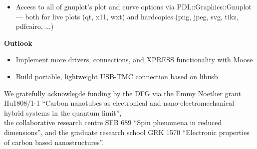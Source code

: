 \documentclass[portrait]{a0poster}
\newcommand{\lightblue}{\color{lightblue}}
\newcommand{\heading}[1]{
  {\color{heading}\boldmath\textbf{\huge #1}}\\[\medskipamount]
}
\begin{document}
{\begin{minipage}[t][\columnheighta-2\fboxsep-2\fboxrule][t]
\begin{minipage}{\textwidth}
\begin{itemize}
\item 
Access to all of gnuplot's {\lightblue plot and curve options} via 
PDL::Graphics::Gnuplot --- both for live plots (qt, x11, wxt) and hardcopies 
(png, jpeg, svg, tikz, pdfcairo, ...)
\end{itemize}

\vspace*{2cm}
\heading{Outlook}
\vspace*{-2cm}

\begin{itemize}
\item Implement more drivers, connections, and XPRESS functionality with
  Moose
\item Build portable, lightweight USB-TMC connection based on libusb
\end{itemize}


\end{minipage}

\end{minipage}}  %
%
%
%

\vspace*{0.5cm}
\begin{center}\color{invheading}\large
\hspace*{-4cm}We gratefully acknowlegde funding by the DFG via the Emmy Noether grant
Hu1808/1-1 ``Carbon nanotubes as electronical and nano-electromechanical hybrid systems in
the quantum limit'',
\\ \hspace*{-4cm}
the collaborative research centre SFB 689 ``Spin phenomena in reduced dimensions'', and
the graduate research school GRK 1570  ``Electronic properties of
carbon based nanostructures''.
\end{center}
\end{document}
